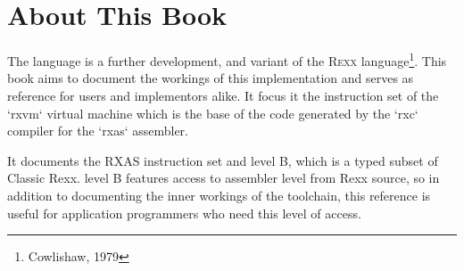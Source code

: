 \def\tightlist{}


\chapter*{About This Book}
The \crexx{} language is a further development, and variant of the
\textsc{Rexx} language\footnote{Cowlishaw, 1979}. This book aims to
document the workings of this implementation and serves as reference
for users and implementors alike. It focus it the instruction set of
the `rxvm` virtual machine which is the base of the code generated
by the `rxc` compiler for the `rxas` assembler.

It documents the RXAS instruction set and \crexx{} level B, which is a
typed subset of Classic Rexx. \crexx{} level B features access to assembler
level from Rexx source, so in addition to documenting the inner workings
of the \crexx{} toolchain, this reference is useful for application
programmers who need this level of access.



